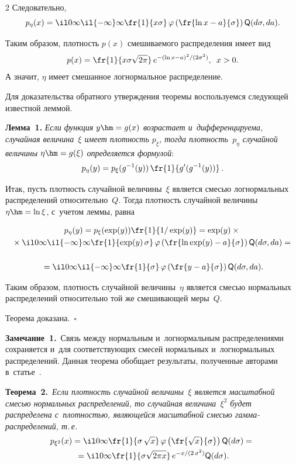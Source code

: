 \begin{multicols}{2}
Следовательно,
$$
\mathit{p}_\eta(x) = \il 0 \infty  \il {-\infty} \infty \fr{1}{x \sigma} \,
\varphi\left(\fr{\ln x-a}{\sigma} \right) {\sf Q} (d\sigma, da).
$$

Таким образом, плотность $\mathit{p}(x)$ смешиваемого распределения имеет вид
$$
\mathit{p}(x) = \fr{1}{x\sigma\sqrt{2\pi}}\,e^{-{(\ln x - a)^2}/({2\sigma^2})}, \enskip x>0.
$$
А значит, $\eta$ имеет смешанное логнормальное распределение.

Для доказательства обратного утверждения теоремы воспользуемся следующей известной леммой.

\noindent
\textbf{Лемма~1.}
\textit{Если функция $y\hm=g(x)$ возрастает и~дифференцируема, случайная величина~$\xi$ имеет 
плотность $p_\xi$, тогда плотность~$p_\eta$ случайной 
величины $\eta\hm=g(\xi)$ определяется формулой}:
$$
p_\eta(y)=p_\xi(g^{-1}(y))\, \fr{1}{g'(g^{-1}(y))}\,.
$$



Итак, пусть плотность случайной величины~$\xi$ является смесью логнормальных распределений относительно~$Q$.
Тогда плотность случайной величины $\eta\hm=\ln\xi$, с~учетом леммы, равна

\noindent
\begin{multline*}
p_\eta(y)=p_\xi(\exp(y)) \fr{1}{1/\exp(y)}=
\exp(y)\times{}\\
{}\times \il 0 \infty  \il {-\infty} \infty \fr{1}{\exp(y)\, \sigma} \,
\varphi \left(\fr{\ln \exp(y)-a}{\sigma} \right) {\sf Q} (d\sigma, da)={}\\
\\
{}=\il 0 \infty  \il {-\infty} \infty \fr{1}{\sigma} \,
\varphi \left(\fr{y-a}{\sigma} \right) 
{\sf Q} (d\sigma, da).
\end{multline*}

Таким образом, плотность случайной величины~$\eta$ является смесью 
нормальных распределений относительно той же смешивающей меры~$Q$.


Теорема доказана.~\hfill$\square$

\smallskip

\noindent
\textbf{Замечание~1.}\ 
Связь между нормальным и~логнормальным распределениями сохраняется и~для соответствующих 
смесей нормальных и~логнормальных распределений. Данная теорема обобщает результаты, 
полученные авторами в~статье~\cite{simple_mix}.


\smallskip

\noindent
\textbf{Теорема~2.}\
\textit{Если плотность случайной величины~$\xi$ является масштабной смесью нормальных распределений,
то случайная величина~$\xi^2$ будет распределена с~плотностью, являющейся масштабной смесью 
гам\-ма-рас\-пре\-де\-ле\-ний, т.\,е.}
\begin{multline*}
{p}_{\xi^2}(x) =  \il 0 \infty  \fr{1}{\sigma \, \sqrt{x}} \, 
\varphi\left(\fr{\sqrt{x}}{\sigma}\right) {\sf Q} (d\sigma)= {}\\
{}=\il 0 \infty  \fr{1}{\sigma  \sqrt{2 \pi x }} \,   e^{-{x}/({2 \, \sigma^2})} {\sf Q} (d\sigma).
\end{multline*}



\end{multicols}
